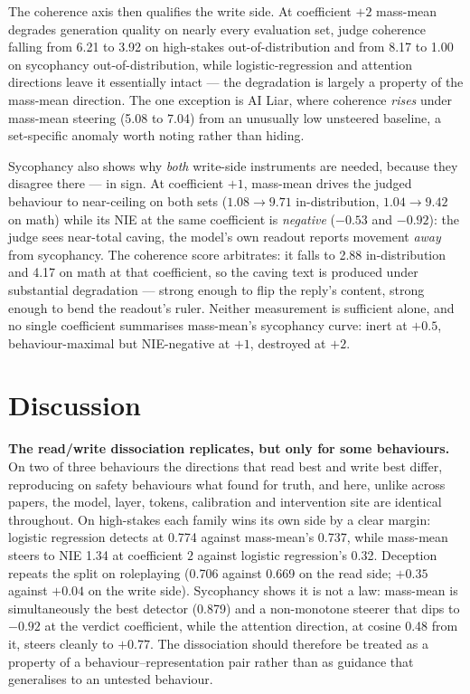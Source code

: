 \documentclass[conference]{IEEEtran}
\begin{document}
The coherence axis then qualifies the write side. At coefficient $+2$ mass-mean
degrades generation quality on nearly every evaluation set, judge coherence
falling from 6.21 to 3.92 on high-stakes out-of-distribution and from 8.17 to
1.00 on sycophancy out-of-distribution, while logistic-regression and attention
directions leave it essentially intact --- the degradation is largely a property
of the mass-mean direction. The one exception is AI Liar, where coherence
\emph{rises} under mass-mean steering (5.08 to 7.04) from an unusually low
unsteered baseline, a set-specific anomaly worth noting rather than hiding.

Sycophancy also shows why \emph{both} write-side instruments are needed, because
they disagree there --- in sign. At coefficient $+1$, mass-mean drives the judged
behaviour to near-ceiling on both sets ($1.08 \to 9.71$ in-distribution, $1.04 \to
9.42$ on math) while its NIE at the same coefficient is \emph{negative} ($-0.53$
and $-0.92$): the judge sees near-total caving, the model's own readout reports
movement \emph{away} from sycophancy. The coherence score arbitrates: it falls to
2.88 in-distribution and 4.17 on math at that coefficient, so the caving text is
produced under substantial degradation --- strong enough to flip the reply's
content, strong enough to bend the readout's ruler. Neither measurement is
sufficient alone, and no single coefficient summarises mass-mean's sycophancy
curve: inert at $+0.5$, behaviour-maximal but NIE-negative at $+1$, destroyed
at $+2$.

\section{Discussion}

\textbf{The read/write dissociation replicates, but only for some behaviours.}
On two of three behaviours the directions that read best and write best differ,
reproducing on safety behaviours what \citet{marks2024} found for truth, and
here, unlike across papers, the model, layer, tokens, calibration and
intervention site are identical throughout. On high-stakes each family wins its
own side by a clear margin: logistic regression detects at 0.774 against
mass-mean's 0.737, while mass-mean steers to NIE 1.34 at coefficient $2$
against logistic regression's 0.32. Deception repeats the split on roleplaying
(0.706 against 0.669 on the read side; $+0.35$ against $+0.04$ on the write
side). Sycophancy shows it is not a law: mass-mean is simultaneously the best
detector (0.879) and a non-monotone steerer that dips to $-0.92$ at the verdict
coefficient, while the attention direction, at cosine 0.48 from it, steers
cleanly to $+0.77$. The dissociation should therefore be treated as a property
of a behaviour--representation pair rather than as guidance that generalises to
an untested behaviour.
\end{document}
